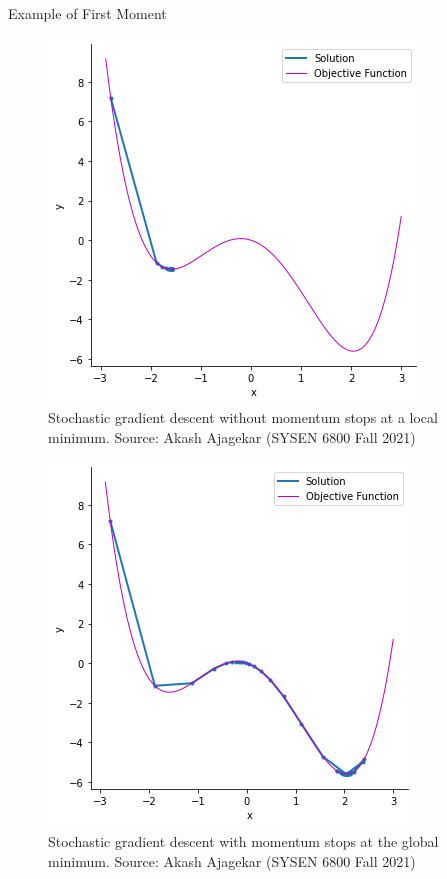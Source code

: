 \documentclass[serif, aspectratio=169]{beamer}
\begin{document}
\begin{frame}{Example of First Moment}
    \begin{minipage}{0.45\linewidth}
        \begin{figure}
            \centering
            \includegraphics[width=0.75\linewidth]{pic/Without_momentum.png}
            \caption{Stochastic gradient descent without momentum stops at a local minimum. Source: Akash Ajagekar (SYSEN 6800 Fall 2021)}
        \end{figure}
    \end{minipage}%
    \begin{minipage}{0.45\linewidth}
        \begin{figure}
            \centering
            \includegraphics[width=0.75\linewidth]{pic/With_momentum.png}
            \caption{Stochastic gradient descent with momentum stops at the global minimum. Source: Akash Ajagekar (SYSEN 6800 Fall 2021)}
        \end{figure}
    \end{minipage}
\end{frame}
\end{document}
